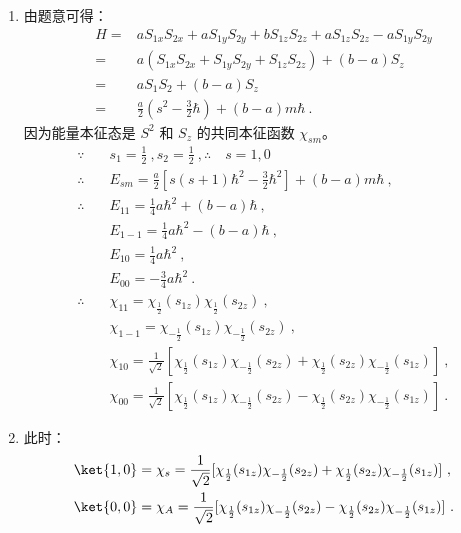 \subsection{ }
\begin{enumerate}
\item 由题意可得：\\
\begin{equation}
\begin{aligned}
H =& aS_{1x}S_{2x}+aS_{1y}S_{2y}+bS_{1z}S_{2z}+aS_{1z}S_{2z}-aS_{1y}S_{2y} \\
=& a(S_{1x}S_{2x}+S_{1y}S_{2y}+S_{1z}S_{2z})+(b-a)S_{z} \\
=& aS_{1}S_{2}+(b-a)S_z \\
=& \frac{a}{2}(s^{2}-\frac{3}{2}\hbar)+(b-a)m\hbar~.
\end{aligned}
\end{equation}
因为能量本征态是 $S^{2}$ 和 $S_{z}$ 的共同本征函数 $\chi_{sm}$。\\
\begin{equation}
\begin{aligned}
\because \quad & s_{1} = \frac{1}{2}~,s_{2}=\frac{1}{2}~, \therefore \quad s=1,0  \\
\therefore \quad & E_{sm} = \frac{a}{2}[s(s+1)\hbar^{2}-\frac{3}{2}\hbar^{2}]+(b-a)m\hbar ~, \\
\therefore \quad & E_{11} = \frac{1}{4}a\hbar^{2}+(b-a)\hbar ~, \\
& E_{1-1} = \frac{1}{4}a\hbar^{2}-(b-a)\hbar ~, \\
& E_{10} = \frac{1}{4}a\hbar^{2} ~, \\
& E_{00} = -\frac{3}{4}a\hbar^{2} ~.\\
\therefore \quad& \chi_{11}= \chi_{\frac{1}{2}}(s_{1z})\chi_{\frac{1}{2}}(s_{2z})~, \\
& \chi_{1-1} = \chi_{-\frac{1}{2}}(s_{1z})\chi_{-\frac{1}{2}}(s_{2z}) ~, \\
& \chi_{10} = \frac{1}{\sqrt{2}}[\chi_{\frac{1}{2}}(s_{1z})\chi_{-\frac{1}{2}}(s_{2z})+\chi_{\frac{1}{2}}(s_{2z})\chi_{-\frac{1}{2}}(s_{1z})]  ~,\\
& \chi_{00} = \frac{1}{\sqrt{2}}[\chi_{\frac{1}{2}}(s_{1z})\chi_{-\frac{1}{2}}(s_{2z})-\chi_{\frac{1}{2}}(s_{2z})\chi_{-\frac{1}{2}}(s_{1z})] ~. 
\end{aligned}
\end{equation}



\item 此时：\\
\begin{equation}
\begin{aligned}
& \ket{1,0}=\chi_{s}=\frac{1}{\sqrt{2}}[\chi_{\frac{1}{2}}(s_{1z})\chi_{-\frac{1}{2}}(s_{2z})+\chi_{\frac{1}{2}}(s_{2z})\chi_{-\frac{1}{2}}(s_{1z})] ~, \\
& \ket{0,0}=\chi_{A}=\frac{1}{\sqrt{2}}[\chi_{\frac{1}{2}}(s_{1z})\chi_{-\frac{1}{2}}(s_{2z})-\chi_{\frac{1}{2}}(s_{2z})\chi_{-\frac{1}{2}}(s_{1z})] ~.
\end{aligned}
\end{equation}

\end{enumerate}
